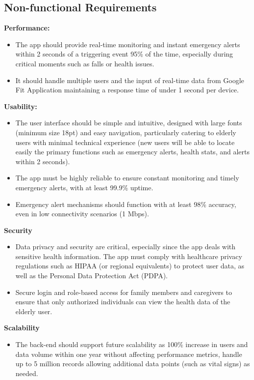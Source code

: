 \subsection{Non-functional Requirements}
\textbf{Performance:}
    \begin{itemize}
            \item The app should provide real-time monitoring and instant emergency alerts within 2 seconds of a triggering event 95\% of the time, especially during critical moments such as falls or health issues.
            \item It should handle multiple users and the input of real-time data from Google Fit Application maintaining a response time of under 1 second per device.
    \end{itemize}
\textbf{Usability:}
    \begin{itemize}
        \item The user interface should be simple and intuitive, designed with large fonts (minimum size 18pt) and easy navigation, particularly catering to elderly users with minimal technical experience (new users will be able to locate easily the primary functions such as emergency alerts, health stats, and alerts within 2 seconds).
        \item The app must be highly reliable to ensure constant monitoring and timely emergency alerts, with at least 99.9\% uptime.
        \item Emergency alert mechanisms should function with at least 98\% accuracy, even in low connectivity scenarios (1 Mbps). 
    \end{itemize}
\textbf{Security}
    \begin{itemize}
        \item Data privacy and security are critical, especially since the app deals with sensitive health information. The app must comply with healthcare privacy regulations such as HIPAA (or regional equivalents) to protect user data, as well as the Personal Data Protection Act (PDPA).
        \item Secure login and role-based access for family members and caregivers to ensure that only authorized individuals can view the health data of the elderly user.
    \end{itemize}
\textbf{Scalability}
    \begin{itemize}
        \item  The back-end should support future scalability as 100\% increase in users and data volume within one year without affecting performance metrics, handle up to 5 million records allowing additional data points (such as vital signs) as needed.
    \end{itemize}
